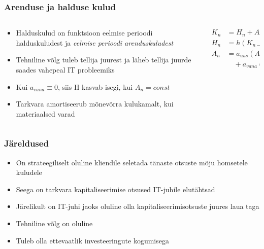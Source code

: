 \begin{frame}[fragile]
  \frametitle{Arenduse ja halduse kulud}
  	\begin{columns}[t]
		\begin{column}[T]{6.5cm}
			\begin{itemize}
				\item Halduskulud on funktsioon eelmise perioodi halduskuludest ja \emph{eelmise perioodi arenduskuludest}
				\item Tehniline võlg tuleb tellija juurest ja läheb tellija juurde saades vahepeal IT probleemiks
				\item Kui $a_{vana}\equiv0$, siis H kasvab isegi, kui $A_n=const$
				\item Tarkvara amortiseerub mõnevõrra kulukamalt, kui materiaalsed varad
			\end{itemize}
		\end{column}
		\begin{column}[T]{3.5cm}
			\begin{align}
				K_n &= H_n+A_n \nonumber \\
			    H_n &= h(K_{n-1}) \nonumber\\
			    A_n &= a_{uus}(A_{n-1}) \nonumber \\
			    &\quad {} + a_{vana}(A_{n-1}) \nonumber
		    \end{align}
		\end{column}
	\end{columns}
\end{frame}

\begin{frame}[fragile]
  \frametitle{Järeldused}
	\begin{itemize}
		\item On strateegiliselt oluline kliendile seletada tänaste otsuste mõju homsetele kuludele
		\item Seega on tarkvara kapitaliseerimise otsused IT-juhile elutähtsad
		\item Järelikult on IT-juhi jaoks oluline olla kapitaliseerimisotsuste juures laua taga
		\item Tehniline võlg on oluline
		\item Tuleb olla ettevaatlik investeeringute kogumisega
	\end{itemize}
\end{frame}


